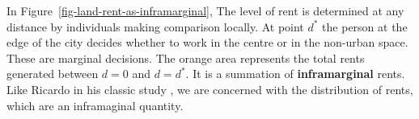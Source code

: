 {In Figure~\ref{fig-land-rent-as-inframarginal}, The level of rent is determined at any distance by individuals making comparison locally. At point $d^*$ the person at the edge of the city decides whether to work in the centre or in the non-urban space. These are \gls{marginal} decisions. The orange area represents  the total rents generated between $d=0$ and $d=d^*$. It is a summation of \textbf{\gls{inframarginal}} rents. Like Ricardo in his classic study \cite{ricardoEssayInfluenceLow1815}, we are concerned with the distribution of rents, which are an  inframaginal quantity.







}
